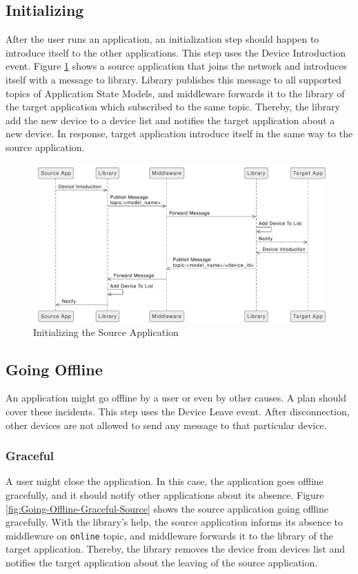 \subsection{Initializing}
After the user runs an application, an initialization step should happen to introduce itself to the other applications. This step uses the Device Introduction event. Figure \ref{fig:Initializing} shows a source application that joins the network and introduces itself with a message to library. Library publishes this message to all supported topics of Application State Models, and middleware forwards it to the library of the target application which subscribed to the same topic. Thereby, the library add the new device to a device list and notifies the target application about a new device. In response, target application introduce itself in the same way to the source application.



\FloatBarrier \begin{figure}[H]
    \includegraphics[width=\linewidth]{../figures/Initializing}
    \centering
    \caption{Initializing the Source Application}
    \label{fig:Initializing}
\end{figure} \FloatBarrier

\subsection{Going Offline}
An application might go offline by a user or even by other causes. A plan should cover these incidents. This step uses the Device Leave event. After disconnection, other devices are not allowed to send any message to that particular device.

\subsubsection{Graceful}
A user might close the application. In this case, the application goes offline gracefully, and it should notify other applications about its absence. Figure \ref{fig:Going-Offline-Graceful-Source} shows the source application going offline gracefully. With the library's help, the source application informs its absence to middleware on \lstinline[basicstyle=\ttfamily]{online} topic, and middleware forwards it to the library of the target application. Thereby, the library removes the device from devices list and notifies the target application about the leaving of the source application. 

